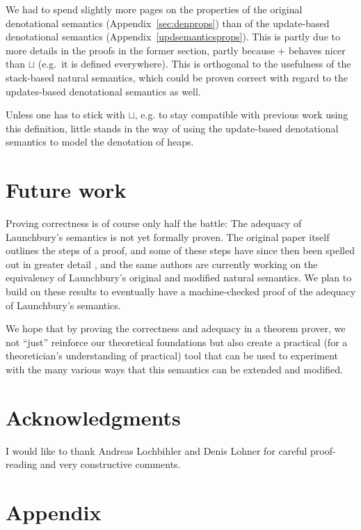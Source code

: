 \documentclass{jfp1}
\theoremstyle{nonumberbreak}
\begin{document}
We had to spend slightly more pages on the properties of the original denotational semantics (Appendix~\ref{sec:denprops}) than of the update-based denotational semantics (Appendix~\ref{updsemanticsprops}). This is partly due to more details in the proofs in the former section, partly because $+$ behaves nicer than $\sqcup$ (e.g.\ it is defined everywhere). This is orthogonal to the usefulness of the stack-based natural semantics, which could be proven correct with regard to the updates-based denotational semantics as well.

Unless one has to stick with $\sqcup$, e.g. to stay compatible with previous work using this definition, little stands in the way of using the update-based denotational semantics to model the denotation of heaps.

\section{Future work}

Proving correctness is of course only half the battle: The adequacy of Launchbury’s semantics is not yet formally proven. The original paper itself outlines the steps of a proof, and some of these steps have since then been spelled out in greater detail \cite{functionspaces}, and the same authors are currently working on the equivalency of Launchbury’s original and modified natural semantics. We plan to build on these results to eventually have a machine-checked proof of the adequacy of Launchbury’s semantics.

We hope that by proving the correctness and adequacy in a theorem prover, we not “just” reinforce our theoretical foundations but also create a practical (for a theoretician’s understanding of practical) tool that can be used to experiment with the many various ways that this semantics can be extended and modified.

\section*{Acknowledgments}

I would like to thank Andreas Lochbihler and Denis Lohner for careful proof-reading and very constructive comments.




\appendix


\section{Appendix}
\end{document}
